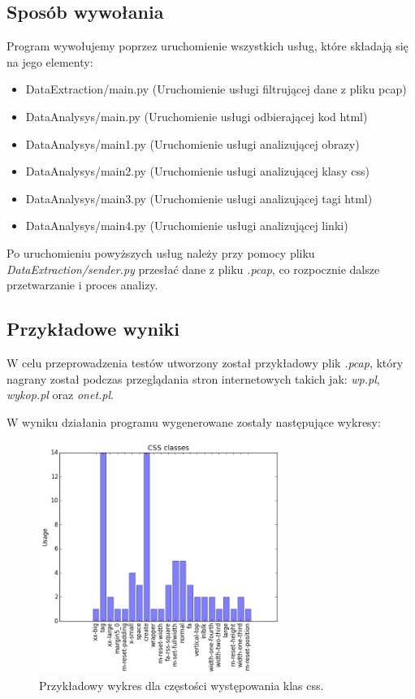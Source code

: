 \documentclass[12pt]{article}
\begin{document}
\subsection{Sposób wywołania}
Program wywołujemy poprzez uruchomienie wszystkich usług, które składają się na jego elementy:
\begin{itemize}
\item DataExtraction/main.py (Uruchomienie usługi filtrującej dane z pliku pcap)
\item DataAnalysys/main.py (Uruchomienie usługi odbierającej kod html)
\item DataAnalysys/main1.py (Uruchomienie usługi analizującej obrazy)
\item DataAnalysys/main2.py (Uruchomienie usługi analizującej klasy css)
\item DataAnalysys/main3.py (Uruchomienie usługi analizującej tagi html)
\item DataAnalysys/main4.py (Uruchomienie usługi analizującej linki)
\end{itemize}

Po uruchomieniu powyższych usług należy przy pomocy pliku \emph{DataExtraction/sender.py} przesłać dane z pliku \emph{.pcap}, co rozpocznie dalsze przetwarzanie i proces analizy. 

\subsection{Przykładowe wyniki}
W celu przeprowadzenia testów utworzony został przykładowy plik \emph{.pcap}, który nagrany został podczas przeglądania stron internetowych takich jak: \emph{wp.pl}, \emph{wykop.pl} oraz \emph{onet.pl}. 

W wyniku działania programu wygenerowane zostały następujące wykresy:

\begin{figure}[h]
\centering
\caption{Przykładowy wykres dla częstości występowania klas css.}
\label{img:wykresCss}
\includegraphics[width=0.7\textwidth]{WykresCss.png}
\end{figure}
\end{document}
